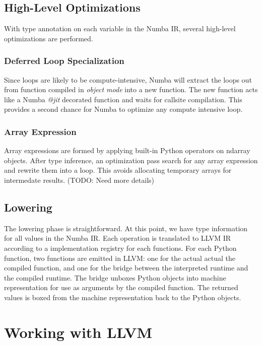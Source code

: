 \documentclass{acm_proc_article-sp}
\begin{document}
\subsection{High-Level Optimizations}

With type annotation on each variable in the Numba IR, several high-level
optimizations are performed.

\subsubsection{Deferred Loop Specialization}

Since loops are likely to be compute-intensive, Numba will extract the loops
out from function compiled in \textit{object mode} into a new function.
The new function acts like a Numba \textit{@jit} decorated function and
waits for callsite compilation. This provides a second chance for Numba to
optimize any compute intensive loop.

\subsubsection{Array Expression}

Array expressions are formed by applying built-in Python operators on
ndarray objects. After type inference, an optimization pass search for any
array expression and rewrite them into a loop. This avoids allocating
temporary arrays for intermedate results.
(TODO: Need more details)

\subsection{Lowering}

The lowering phase is straightforward.  At this point, we have type information
for all values in the Numba IR. Each operation is translated to LLVM IR
according to a implementation registry for each functions.  For each Python
function, two functions are emitted in LLVM: one for the actual
actual the compiled function, and one for the bridge between the interpreted
runtime and the compiled runtime. The bridge unboxes Python objects into
machine representation for use as arguments by the compiled function.  The
returned values is boxed from the machine representation back to the Python
objects.


\section{Working with LLVM}
\end{document}

